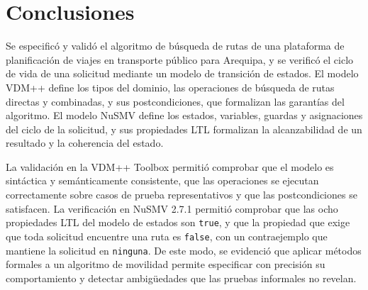 \section{Conclusiones}
\label{sec:conclusiones}

Se especificó y validó el algoritmo de búsqueda de rutas de una
plataforma de planificación de viajes en transporte público para
Arequipa, y se verificó el ciclo de vida de una solicitud mediante un
modelo de transición de estados. El modelo VDM++ define los tipos del
dominio, las operaciones de búsqueda de rutas directas y combinadas, y
sus postcondiciones, que formalizan las garantías del algoritmo. El
modelo NuSMV define los estados, variables, guardas y asignaciones del
ciclo de la solicitud, y sus propiedades LTL formalizan la alcanzabilidad
de un resultado y la coherencia del estado.

La validación en la VDM++ Toolbox permitió comprobar que el modelo es
sintáctica y semánticamente consistente, que las operaciones se ejecutan
correctamente sobre casos de prueba representativos y que las
postcondiciones se satisfacen. La verificación en NuSMV 2.7.1 permitió
comprobar que las ocho propiedades LTL del modelo de estados son
\texttt{true}, y que la propiedad que exige que toda solicitud encuentre
una ruta es \texttt{false}, con un contraejemplo que mantiene la
solicitud en \texttt{ninguna}. De este modo, se evidenció que aplicar
métodos formales a un algoritmo de movilidad permite especificar con
precisión su comportamiento y detectar ambigüedades que las pruebas
informales no revelan.
